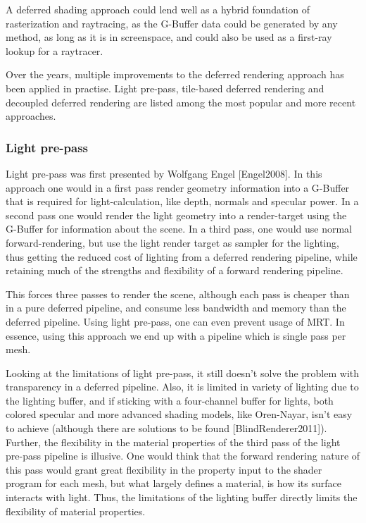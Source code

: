 A deferred shading approach could lend well as a hybrid foundation of rasterization and raytracing, as the G-Buffer data could be generated by any method, as long as it is in screenspace, and could also be used as a first-ray lookup for a raytracer.

Over the years, multiple improvements to the deferred rendering approach has been applied in practise. Light pre-pass, tile-based deferred rendering and decoupled deferred rendering are listed among the most popular and more recent approaches.

\subsubsection{Light pre-pass}

Light pre-pass was first presented by Wolfgang Engel [Engel2008]. In this approach one would in a first pass render geometry information into a G-Buffer that is required for light-calculation, like depth, normals and specular power. In a second pass one would render the light geometry into a render-target using the G-Buffer for information about the scene. In a third pass, one would use normal forward-rendering, but use the light render target as sampler for the lighting, thus getting the reduced cost of lighting from a deferred rendering pipeline, while retaining much of the strengths and flexibility of a forward rendering pipeline. 

This forces three passes to render the scene, although each pass is cheaper than in a pure deferred pipeline, and consume less bandwidth and memory than the deferred pipeline. Using light pre-pass, one can even prevent usage of MRT. In essence, using this approach we end up with a pipeline which is single pass per mesh.

Looking at the limitations of light pre-pass, it still doesn't solve the problem with transparency in a deferred pipeline. Also, it is limited in variety of lighting due to the lighting buffer, and if sticking with a four-channel buffer for lights, both colored specular and more advanced shading models, like Oren-Nayar, isn't easy to achieve (although there are solutions to be found [BlindRenderer2011]). Further, the flexibility in the material properties of the third pass of the light pre-pass pipeline is illusive. One would think that the forward rendering nature of this pass would grant great flexibility in the property input to the shader program for each mesh, but what largely defines a material, is how its surface interacts with light. Thus, the limitations of the lighting buffer directly limits the flexibility of material properties.

